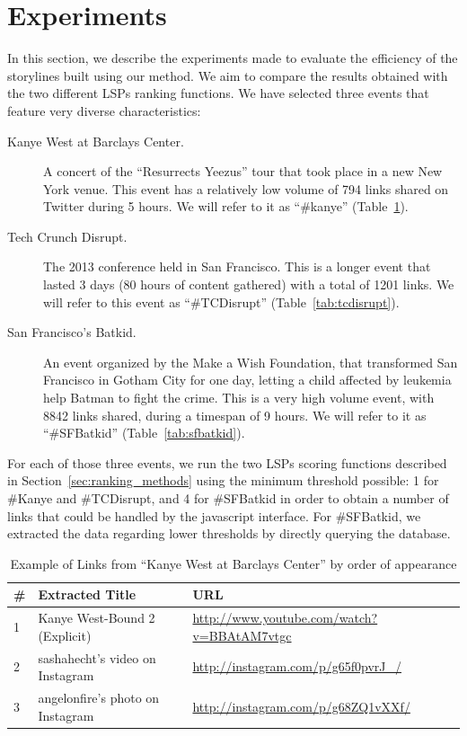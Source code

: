\documentclass{sig-alternate}
\begin{document}
\section{Experiments}
\label{sec:experiments}
In this section, we describe the experiments made to evaluate the efficiency of the storylines built using our method. We aim to compare the results obtained with the two different LSPs ranking functions. We have selected three events that feature very diverse characteristics:
\begin{description}
 \item[Kanye West at Barclays Center.] A concert of the ``Resurrects Yeezus'' tour that took place in a new New York venue. This event has a relatively low volume of 794 links shared on Twitter during 5 hours. We will refer to it as ``\#kanye'' (Table~\ref{tab:kanye}).
 \item[Tech Crunch Disrupt.] The 2013 conference held in San Francisco. This is a longer event that lasted 3 days (80 hours of content gathered) with a total of 1201 links. We will refer to this event as ``\#TCDisrupt'' (Table~\ref{tab:tcdisrupt}).
 \item[San Francisco's Batkid.] An event organized by the Make a Wish Foundation, that transformed San Francisco in Gotham City for one day, letting a child affected by leukemia help Batman to fight the crime. This is a very high volume event, with 8842 links shared, during a timespan of 9 hours. We will refer to it as ``\#SFBatkid'' (Table~\ref{tab:sfbatkid}).
\end{description}

For each of those three events, we run the two LSPs scoring functions described in Section~\ref{sec:ranking_methods} using the minimum threshold possible: 1 for \#Kanye and \#TCDisrupt, and 4 for \#SFBatkid in order to obtain a number of links that could be handled by the javascript interface. For \#SFBatkid, we extracted the data regarding lower thresholds by directly querying the database.

\begin{table}[htbp]
 \begin{tabular}{| p{0.2cm} | p{3.5cm} | p{3.8cm} |}
  \hline
  \textbf{\#} & \textbf{Extracted Title} & \textbf{URL} \\
  \hline
  1 & Kanye West-Bound 2 (Explicit) & \url{http://www.youtube.com/watch?v=BBAtAM7vtgc} \\
  \hline
  2 & sashahecht's video on Instagram & \url{http://instagram.com/p/g65f0pvrJ_/} \\
  \hline
  3 & angelonfire's photo on Instagram & \url{http://instagram.com/p/g68ZQ1vXXf/} \\
  \hline
 \end{tabular}
 \caption{Example of Links from ``Kanye West at Barclays Center'' by order of appearance}
 \label{tab:kanye}
\end{table}
\end{document}

